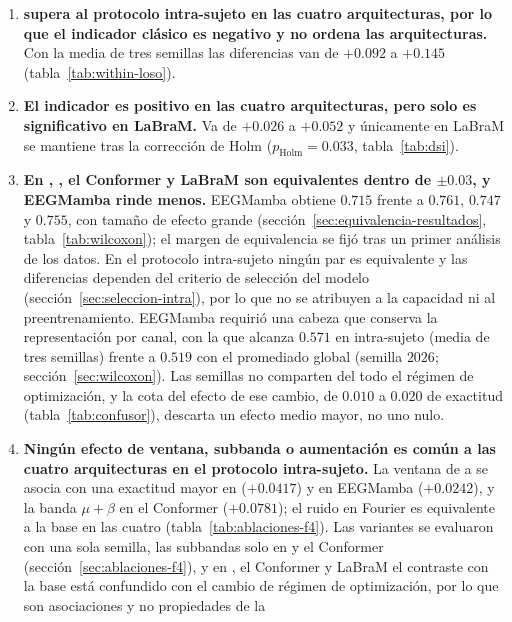 \begin{enumerate}
  \item \textbf{\loso{} supera al protocolo intra-sujeto en las cuatro arquitecturas, por lo que el
        indicador clásico es negativo y no ordena las arquitecturas.} Con la media de tres semillas las
        diferencias van de $+0.092$ a $+0.145$ (tabla~\ref{tab:within-loso}).
  \item \textbf{El indicador \dsi{} es positivo en las cuatro arquitecturas, pero solo es significativo en
        LaBraM.} Va de $+0.026$ a $+0.052$ y únicamente en LaBraM se mantiene tras la corrección de Holm
        ($p_{\text{Holm}} = 0.033$, tabla~\ref{tab:dsi}).
  \item \textbf{En \loso{}, \eegnet{}, el Conformer y LaBraM son equivalentes dentro de $\pm 0.03$, y
        EEGMamba rinde menos.} EEGMamba obtiene $0.715$ frente a $0.761$, $0.747$ y $0.755$, con tamaño de
        efecto grande (sección~\ref{sec:equivalencia-resultados}, tabla~\ref{tab:wilcoxon}); el margen
        de equivalencia se fijó tras un primer análisis de los datos. En el protocolo
        intra-sujeto ningún par es equivalente y las diferencias dependen del criterio de selección del
        modelo (sección~\ref{sec:seleccion-intra}), por lo que no se atribuyen a la capacidad ni al
        preentrenamiento. EEGMamba requirió una cabeza que conserva la representación por canal, con la que
        alcanza $0.571$ en intra-sujeto (media de tres semillas) frente a $0.519$ con el promediado global
        (semilla $2026$; sección~\ref{sec:wilcoxon}). Las semillas no comparten del todo el régimen de
        optimización, y la cota del efecto de ese cambio, de $0.010$ a $0.020$ de exactitud
        (tabla~\ref{tab:confusor}), descarta un efecto medio mayor, no uno nulo.
  \item \textbf{Ningún efecto de ventana, subbanda o aumentación es común a las cuatro arquitecturas en el
        protocolo intra-sujeto.} La ventana de  a  se asocia con una exactitud mayor en
        \eegnet{} ($+0.0417$) y en EEGMamba ($+0.0242$), y la banda $\mu+\beta$ en el Conformer
        ($+0.0781$); el ruido en Fourier es equivalente a la base en las cuatro (tabla~\ref{tab:ablaciones-f4}).
        Las variantes se evaluaron con una sola semilla, las subbandas solo en \eegnet{} y el Conformer
        (sección~\ref{sec:ablaciones-f4}), y en \eegnet{}, el Conformer y LaBraM el contraste con la base está
        confundido con el cambio de régimen de optimización, por lo que son asociaciones y no propiedades de la

\end{enumerate}
